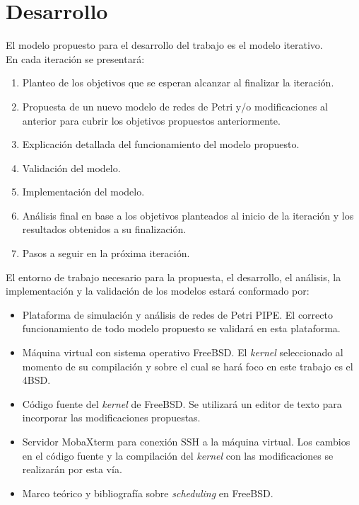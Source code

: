 \documentclass[a4paper]{book}
\begin{document}
\newpage
\section{Desarrollo}
El modelo propuesto para el desarrollo del trabajo es el modelo iterativo.\\

En cada iteración se presentará:
\begin{enumerate}
\item Planteo de los objetivos que se esperan alcanzar al finalizar la iteración.
\item Propuesta de un nuevo modelo de redes de Petri y/o modificaciones al anterior para cubrir los objetivos propuestos anteriormente.
\item Explicaci\'on detallada del funcionamiento del modelo propuesto.
\item Validaci\'on del modelo.
\item Implementaci\'on del modelo.
\item An\'alisis final en base a los objetivos planteados al inicio de la iteraci\'on y los resultados obtenidos a su finalizaci\'on.
\item Pasos a seguir en la pr\'oxima iteraci\'on.
\end{enumerate}

El entorno de trabajo necesario para la propuesta, el desarrollo, el an\'alisis, la implementaci\'on y la validaci\'on de los modelos estar\'a conformado por:
\begin{itemize}
\item Plataforma de simulaci\'on y an\'alisis de redes de Petri PIPE. El correcto funcionamiento de todo modelo propuesto se validar\'a en esta plataforma.
\item M\'aquina virtual con sistema operativo FreeBSD. El \emph{kernel} seleccionado al momento de su compilaci\'on y sobre el cual se har\'a foco en este trabajo es el 4BSD.
\item C\'odigo fuente del \emph{kernel} de FreeBSD. Se utilizar\'a un editor de texto para incorporar las modificaciones propuestas.
\item Servidor MobaXterm para conexi\'on SSH a la m\'aquina virtual. Los cambios en el c\'odigo fuente y la compilaci\'on del \emph{kernel} con las modificaciones se realizar\'an por esta v\'ia.
\item Marco te\'orico y bibliograf\'ia sobre \emph{scheduling} en FreeBSD.
\end{itemize}
\end{document}
